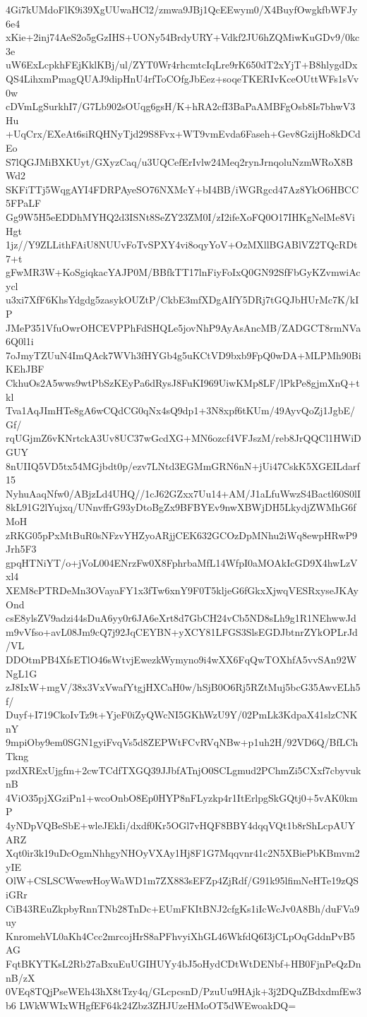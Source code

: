 4Gi7kUMdoFlK9i39XgUUwaHCl2/zmwa9JBj1QcEEwym0/X4BuyfOwgkfbWFJy6e4
xKie+2inj74AeS2o5gGzIHS+UONy54BrdyURY+Vdkf2JU6hZQMiwKuGDv9/0kc3e
uW6ExLcpkhFEjKklKBj/ul/ZYT0Wr4rhcmtcIqLre9rK650dT2xYjT+B8hlygdDx
QS4LihxmPmagQUAJ9dipHnU4rfToCOfgJbEez+soqeTKERIvKceOUttWFs1sVv0w
cDVmLgSurkhI7/G7Lb902sOUqg6gsH/K+hRA2cfI3BaPaAMBFgOsb8Is7bhwV3Hu
+UqCrx/EXeAt6siRQHNyTjd29S8Fvx+WT9vmEvda6Faseh+Gev8GzijHo8kDCdEo
S7lQGJMiBXKUyt/GXyzCaq/u3UQCefErIvlw24Meq2rynJrnqoluNzmWRoX8BWd2
SKFiTTj5WqgAYI4FDRPAyeSO76NXMcY+bI4BB/iWGRgcd47Az8YkO6HBCC5FPaLF
Gg9W5H5eEDDhMYHQ2d3ISNt8SeZY23ZM0I/zI2ifeXoFQ0O17IHKgNelMe8ViHgt
1jz//Y9ZLLithFAiU8NUUvFoTvSPXY4vi8oqyYoV+OzMXllBGABlVZ2TQcRDt7+t
gFwMR3W+KoSgiqkacYAJP0M/BBfkTT17lnFiyFoIxQ0GN92SfFbGyKZvmwiAcycl
u3xi7XfF6KhsYdgdg5zasykOUZtP/CkbE3mfXDgAIfY5DRj7tGQJbHUrMc7K/kIP
JMeP351VfuOwrOHCEVPPhFdSHQLe5jovNhP9AyAsAncMB/ZADGCT8rmNVa6Q0l1i
7oJmyTZUuN4ImQAck7WVh3fHYGb4g5uKCtVD9bxb9FpQ0wDA+MLPMh90BiKEhJBF
CkhuOs2A5wws9wtPbSzKEyPa6dRysJ8FuKI969UiwKMp8LF/lPkPe8gjmXnQ+tkl
Tva1AqJImHTe8gA6wCQdCG0qNx4sQ9dp1+3N8xpf6tKUm/49AyvQoZj1JgbE/Gf/
rqUGjmZ6vKNrtckA3Uv8UC37wGcdXG+MN6ozcf4VFJszM/reb8JrQQCl1HWiDGUY
8nUIIQ5VD5tx54MGjbdt0p/ezv7LNtd3EGMmGRN6nN+jUi47CskK5XGEILdarf15
NyhuAaqNfw0/ABjzLd4UHQ//1cJ62GZxx7Uu14+AM/J1aLfuWwzS4Bactl60S0lI
8kL91G2lYujxq/UNnvffrG93yDtoBgZx9BFBYEv9nwXBWjDH5LkydjZWMhG6fMoH
zRKG05pPxMtBuR0sNFzvYHZyoARjjCEK632GCOzDpMNhu2iWq8ewpHRwP9Jrh5F3
gpqHTNiYT/o+jVoL004ENrzFw0X8FphrbaMfL14WfpI0aMOAkIcGD9X4hwLzVxl4
XEM8cPTRDeMn3OVayaFY1x3fTw6xnY9F0T5kljeG6fGkxXjwqVESRxyseJKAyOnd
csE8ylsZV9adzi44sDuA6yy0r6JA6eXrt8d7GbCH24vCb5ND8sLh9g1R1NEhwwJd
m9vVfso+avL08Jm9cQ7j92JqCEYBN+yXCY81LFGS3SlsEGDJbtnrZYkOPLrJd/VL
DDOtmPB4XfsETlO46sWtvjEwezkWymyno9i4wXX6FqQwTOXhfA5vvSAn92WNgL1G
zJ8IxW+mgV/38x3VxVwafYtgjHXCaH0w/hSjB0O6Rj5RZtMuj5bcG35AwvELh5f/
Duyf+I719CkoIvTz9t+YjeF0iZyQWcNI5GKhWzU9Y/02PmLk3KdpaX41slzCNKnY
9mpiOby9em0SGN1gyiFvqVs5d8ZEPWtFCvRVqNBw+p1uh2H/92VD6Q/BfLChTkng
pzdXRExUjgfm+2cwTCdfTXGQ39JJbfATnjO0SCLgmud2PChmZi5CXxf7cbyvuknB
4ViO35pjXGziPn1+wcoOnbO8Ep0HYP8nFLyzkp4r1ItErlpgSkGQtj0+5vAK0kmP
4yNDpVQBeSbE+wleJEkIi/dxdf0Kr5OGl7vHQF8BBY4dqqVQt1b8rShLcpAUYARZ
Xqt0ir3k19uDcOgmNhhgyNHOyVXAy1Hj8F1G7Mqqvnr41c2N5XBiePbKBmvm2yIE
OlW+CSLSCWwewHoyWaWD1m7ZX883sEFZp4ZjRdf/G91k95lfimNeHTe19zQSiGRr
CiB43REuZkpbyRnnTNb28TnDc+EUmFKItBNJ2cfgKs1iIcWcJv0A8Bh/duFVa9uy
KnromehVL0aKh4Ccc2mrcojHrS8aPFhvyiXhGL46WkfdQ6I3jCLpOqGddnPvB5AG
FqtBKYTKsL2Rb27aBxuEuUGIHUYy4bJ5oHydCDtWtDENbf+HB0FjnPeQzDnnB/zX
0VEq8TQjPseWEh43hX8tTzy4q/GLcpcsnD/PzuUu9HAjk+3j2DQuZBdxdmfEw3b6
LWkWWIxWHgfEF64k24Zbz3ZHJUzeHMoOT5dWEwoakDQ=
